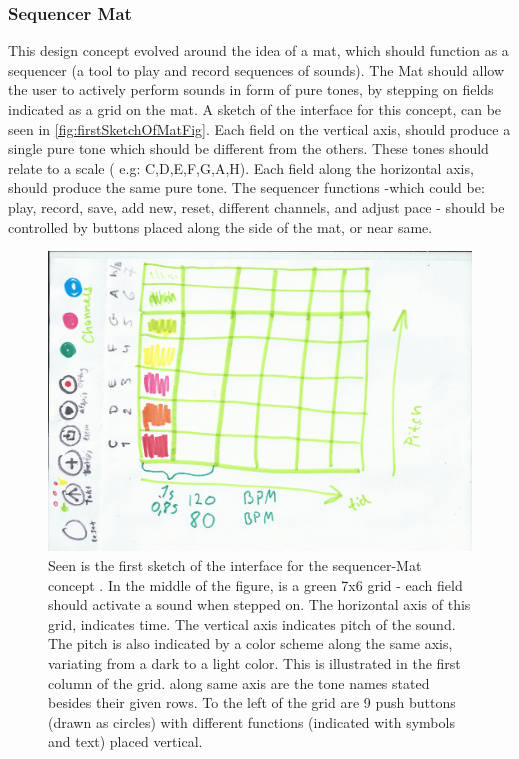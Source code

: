 \subsubsection{Sequencer Mat}\label{sequencerMat}
This design concept evolved around the idea of a mat, which should function as a sequencer (a tool to play and record sequences of sounds). The Mat should allow the user to actively perform sounds in form of pure tones, by stepping on fields indicated as a grid on the mat. A sketch of the interface for this concept, can be seen in \autoref{fig:firstSketchOfMatFig}. Each field on the vertical axis, should produce a single pure tone which should be different from the others. These tones should relate to a scale ( e.g:  C,D,E,F,G,A,H). Each field along the horizontal axis, should produce the same pure tone. The sequencer functions -which could be: play, record, save, add new, reset, different channels, and adjust pace - should be controlled by buttons placed along the side of the mat, or near same.     

\begin{figure}[H]
	\centering
	\includegraphics[width=0.9\linewidth]{figure/Design/firstSketchOfMat} 
	\caption{Seen is the first sketch of the interface for the sequencer-Mat concept . In the middle of the figure, is a green 7x6 grid - each field should activate a sound when stepped on. The horizontal axis of this grid, indicates time. The vertical axis indicates pitch of the sound. The pitch is also indicated by a color scheme along the same axis, variating from a dark to a light color. This is illustrated in the first column of the grid. along same axis are the tone names stated besides their given rows. To the left of the grid are 9 push buttons (drawn as circles) with different functions (indicated with symbols and text) placed vertical. }
	\label{fig:firstSketchOfMatFig}
\end{figure}

